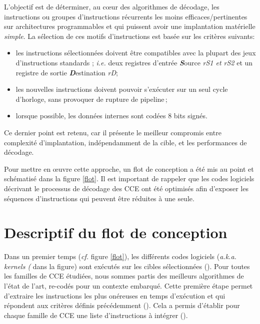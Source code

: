 \documentclass[../main.tex]{subfiles}
\begin{document}
L'objectif est de déterminer, au cœur des algorithmes de décodage, les instructions ou groupes d'instructions récurrents les moins efficaces/pertinentes sur architectures programmables et qui puissent avoir une implantation matérielle \textit{simple}.
La sélection de ces motifs d'instructions est basée sur les critères suivants:  
\begin{itemize}
    \item les instructions sélectionnées doivent être compatibles avec la plupart des jeux d'instructions standards ; \textit{i.e.} deux registres d'entrée \textit{\textbf{S}}ource \textit{rS1 et rS2} et un registre de sortie \textit{\textbf{D}}estination \textit{rD};
    \item les nouvelles instructions doivent pouvoir s'exécuter sur un seul cycle d'horloge, sans provoquer de rupture de pipeline ;
    \item lorsque possible, les données internes sont codées 8 bits signés.
\end{itemize}
Ce dernier point est retenu, car il présente le meilleur compromis entre complexité d'implantation, indépendamment de la cible, et les performances de décodage. 

Pour mettre en œuvre cette approche, un flot de conception a été mis au point et schématisé dans la figure \ref{flot}. 
Il est important de rappeler que les codes logiciels décrivant le processus de décodage des CCE ont été optimisés afin d'exposer les séquences d'instructions qui peuvent être réduites à une seule.


%
%
%
%
\section{Descriptif du flot de conception} 
%
%
%
%

Dans un premier temps (\textit{cf.} figure \ref{flot}), les différents codes logiciels (\textit{a.k.a. kernels (} dans la figure) sont exécutés sur les cibles sélectionnées ().
Pour toutes les familles de CCE étudiées, nous sommes partis des meilleurs algorithmes de l'état de l'art, re-codés pour un contexte embarqué. Cette première étape permet d'extraire les instructions les plus onéreuses en temps d'exécution et qui répondent aux critères définis précédemment (). Cela a permis d'établir pour chaque famille de CCE une liste d'instructions à intégrer ().
\end{document}
